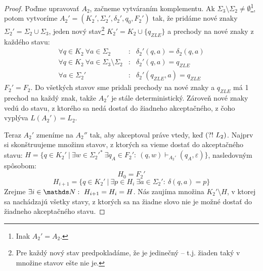 \begin{proof}
Poďme upravovať $A_2$, začneme vytváraním komplementu. Ak $\Sigma_3 \setminus \Sigma_2 \neq\emptyset$\footnote{Inak $A_2'=A_2$.}, potom vytvoríme $A_2'= (K_2',\Sigma_2',\delta_2',q_{0},F_2')$ tak, že pridáme nové znaky $\Sigma_2'=\Sigma_2 \cup \Sigma_3$,  jeden nový stav\footnote{Pre každý nový stav predpokladáme, že je jedinečný -- t.j. žiaden taký v množine stavov ešte nie je.} $K_2'=K_2 \cup \lbrace q_{ZLE} \rbrace$ a prechody na nové znaky z každého stavu: 
\begin{eqnarray*}
 \forall q \in K_2 ~ \forall a \in \Sigma_2 &:&  \delta_2'(q,a)=\delta_2(q,a) \\
 \forall q \in K_2~ \forall a \in \Sigma_3 \setminus \Sigma_2 &:& \delta_2'(q,a)=q_{ZLE} \\
 \forall a \in \Sigma_2' &:&  \delta_2'(q_{ZLE},a)=q_{ZLE}
\end{eqnarray*}
 $F_2'=F_2.$ Do všetkých stavov sme pridali prechody na nové znaky a $q_{ZLE}$ má 1 prechod na každý znak, takže $A_2'$ je stále deterministický. Zároveň nové znaky vedú do stavu, z ktorého sa nedá dostať do žiadneho akceptačného, z čoho vyplýva $L(A_2')=L_2$.

Teraz $A_2'$ zmeníme na $A_2''$ tak, aby akceptoval práve vtedy, keď $\text{(?!~} L_2)$. Najprv si skonštruujeme množinu stavov, z ktorých sa vieme dostať do akceptačného stavu: $H= \lbrace  q \in K_2'~|~ \exists w \in {\Sigma_2'}^* ~ \exists q_A \in F_2': ~ (q,w)\vdash_{A_2'}(q_A,\varepsilon) \rbrace $, nasledovným spôsobom: $$ H_0 = F_2' $$ 
$$H_{i+1} = \lbrace q \in K_2'~|~ \exists p \in H_i~ \exists a \in \Sigma_2': ~ \delta(q,a)=p \rbrace$$
Zrejme $\exists i \in \N: ~ H_{i+1}=H_i = H$. Nás zaujíma množina $K_2' \setminus H$, v ktorej sa nachádzajú všetky stavy, z ktorých sa na žiadne slovo nie je možné dostať do žiadneho akceptačného stavu.


\end{proof}
